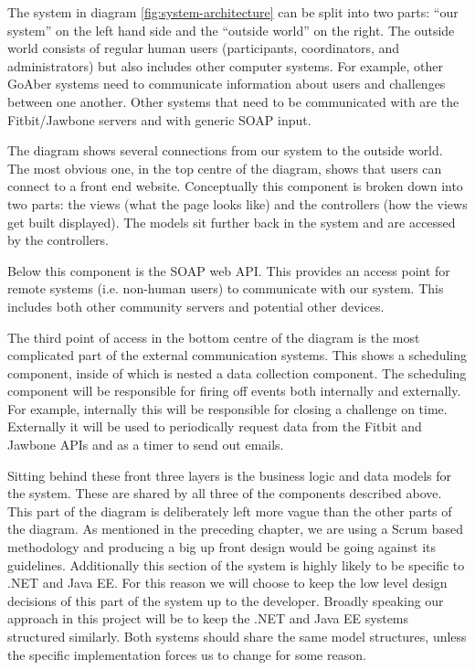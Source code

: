 The system in diagram \ref{fig:system-architecture} can be split into two parts: ``our system'' on the left hand side and the ``outside world'' on the right. The outside world consists of regular human users (participants, coordinators, and administrators) but also includes other computer systems. For example, other GoAber systems need to communicate information about users and challenges between one another. Other systems that need to be communicated with are the Fitbit/Jawbone servers and with generic SOAP input.

The diagram shows several connections from our system to the outside world. The most obvious one, in the top centre of the diagram, shows that users can connect to a front end website. Conceptually this component is broken down into two parts: the views (what the page looks like) and the controllers (how the views get built displayed). The models sit further back in the system and are accessed by the controllers.

Below this component is the SOAP web API. This provides an access point for remote systems (i.e. non-human users) to communicate with our system. This includes both other community servers and potential other devices.

The third point of access in the bottom centre of the diagram is the most complicated part of the external communication systems. This shows a scheduling component, inside of which is nested a data collection component. The scheduling component will be responsible for firing off events both internally and externally. For example, internally this will be responsible for closing a challenge on time. Externally it will be used to periodically request data from the Fitbit and Jawbone APIs and as a timer to send out emails.

Sitting behind these front three layers is the business logic and data models for the system. These are shared by all three of the components described above. This part of the diagram is deliberately left more vague than the other parts of the diagram. As mentioned in the preceding chapter, we are using a Scrum based methodology and producing a big up front design would be going against its guidelines. Additionally this section of the system is highly likely to be specific to .NET and Java EE. For this reason we will choose to keep the low level design decisions of this part of the system up to the developer. Broadly speaking our approach in this project will be to keep the .NET and Java EE systems structured similarly. Both systems should share the same model structures, unless the specific implementation forces us to change for some reason.

